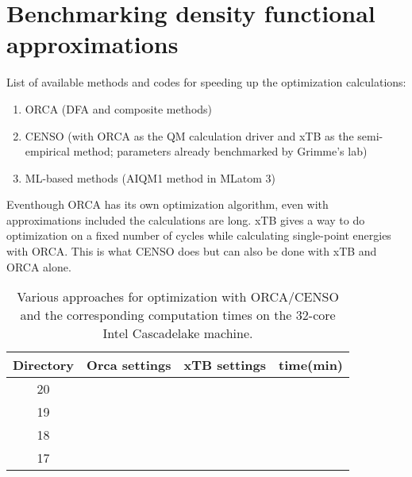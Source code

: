 \section{Benchmarking density functional approximations}
List of available methods and codes for speeding up the optimization calculations:
\begin{enumerate}
    \item ORCA (DFA and composite methods)
    \item CENSO (with ORCA as the QM calculation driver and xTB as the semi-empirical method; parameters already benchmarked by Grimme's lab)
    \item ML-based methods (AIQM1 method in MLatom 3)
\end{enumerate}
Eventhough ORCA has its own optimization algorithm, even with approximations included the calculations are long.
xTB gives a way to do optimization on a fixed number of cycles while calculating single-point energies with ORCA. This is what CENSO does but can also be done with xTB and ORCA alone.
\begin{table}
\centering

\begin{tabular}{|c|c|c|c|} \hline
Directory & Orca settings & xTB settings & time(min) \\ \hline
20 &  &  & \\ \hline
19 &  &  & \\ \hline
18 &  &  & \\ \hline
17 &  &  & \\ \hline

\end{tabular}
\caption{Various approaches for optimization with ORCA/CENSO and the corresponding computation times on the 32-core Intel Cascadelake machine.}
\end{table}